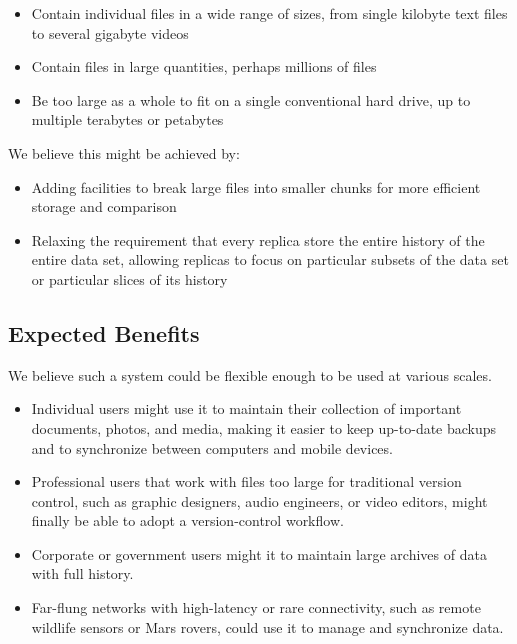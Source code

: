 \documentclass[a4paper]{article}
\begin{document}
\begin{itemize}

  \item Contain individual files in a wide range of sizes, from single kilobyte
    text files to several gigabyte videos

  \item Contain files in large quantities, perhaps millions of files

  \item Be too large as a whole to fit on a single conventional hard drive, up
    to multiple terabytes or petabytes

\end{itemize}

We believe this might be achieved by:

\begin{itemize}

  \item Adding facilities to break large files into smaller chunks for more
    efficient storage and comparison

  \item Relaxing the requirement that every replica store the entire history of
    the entire data set, allowing replicas to focus on particular subsets of the
    data set or particular slices of its history

\end{itemize}


\subsection{Expected Benefits}

We believe such a system could be flexible enough to be used at various scales.

\begin{itemize}

  \item Individual users might use it to maintain their collection of important
    documents, photos, and media, making it easier to keep up-to-date backups
    and to synchronize between computers and mobile devices.

  \item Professional users that work with files too large for traditional
    version control, such as graphic designers, audio engineers, or video
    editors, might finally be able to adopt a version-control workflow.

  \item Corporate or government users might it to maintain large archives of
    data with full history.

  \item Far-flung networks with high-latency or rare connectivity, such as
    remote wildlife sensors or Mars rovers, could use it to manage and
    synchronize data.

\end{itemize}
\end{document}
